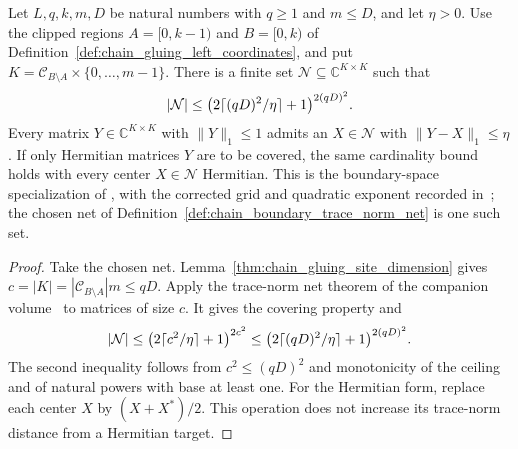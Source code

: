 \begin{lemma}
    \label{thm:chain_boundary_trace_norm_net}
    \leanok
    Let $L,q,k,m,D$ be natural numbers with $q\ge1$ and $m\le D$, and let
    $\eta>0$. Use the clipped regions $A=\lbrack0,k-1)$ and $B=\lbrack0,k)$ of
    Definition~\ref{def:chain_gluing_left_coordinates}, and put
    $K=\mathcal C_{B\setminus A}\times\{0,\ldots,m-1\}$.
    There is a finite set $\mathcal N\subseteq\mathbb C^{K\times K}$ such that
    \begin{align}
        |\mathcal N|\le
        \bigl(2\lceil(qD)^2/\eta\rceil+1\bigr)^{2(qD)^2}. \notag
    \end{align}
    Every matrix $Y\in\mathbb C^{K\times K}$ with $\|Y\|_1\le1$ admits an
    $X\in\mathcal N$ with $\|Y-X\|_1\le\eta$.
    If only Hermitian matrices $Y$ are to be covered, the same cardinality
    bound holds with every center $X\in\mathcal N$ Hermitian.
    This is the boundary-space specialization of
    \cite[Lemma~2.4, source lines 451--460]{Landau2015Polynomial}, with the
    corrected grid and quadratic exponent recorded in~\cite{gap:lvv13_trace_norm_net};
    the chosen net of Definition~\ref{def:chain_boundary_trace_norm_net} is one such set.
\end{lemma}
\begin{proof}
    \leanok
    Take the chosen net. Lemma~\ref{thm:chain_gluing_site_dimension} gives
    $c=|K|=|\mathcal C_{B\setminus A}|m\le qD$.
    Apply the trace-norm net theorem of the companion
    volume~\cite[``A trace-norm net'']{QICLean2026Blueprint} to matrices of size $c$.
    It gives the covering property and
    \begin{align}
        |\mathcal N|
        \le\bigl(2\lceil c^2/\eta\rceil+1\bigr)^{2c^2}
        \le\bigl(2\lceil(qD)^2/\eta\rceil+1\bigr)^{2(qD)^2}. \notag
    \end{align}
    The second inequality follows from $c^2\le(qD)^2$ and monotonicity of
    the ceiling and of natural powers with base at least one.
    For the Hermitian form, replace each center $X$ by
    $(X+X^*)/2$. This operation does not increase its trace-norm distance
    from a Hermitian target.
\end{proof}

